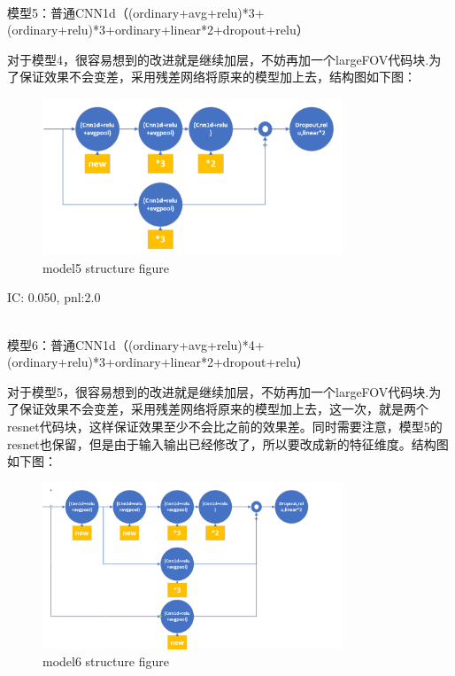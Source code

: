 \documentclass[11pt]{ctexart}
\begin{document}
~\\
模型5：普通CNN1d（(ordinary+avg+relu)*3+(ordinary+relu)*3+ordinary+linear*2+dropout+relu）

对于模型4，很容易想到的改进就是继续加层，不妨再加一个largeFOV代码块.为了保证效果不会变差，采用残差网络将原来的模型加上去，结构图如下图：
\begin{figure}[H]
\begin{center}
\includegraphics[width=0.8\textwidth]{str2.PNG}
\end{center}
\caption{model5 structure figure}
\label{FIG.2}
\end{figure}

{\kaishu \small IC: 0.050, pnl:2.0}

~\\
模型6：普通CNN1d（(ordinary+avg+relu)*4+(ordinary+relu)*3+ordinary+linear*2+dropout+relu）

对于模型5，很容易想到的改进就是继续加层，不妨再加一个largeFOV代码块.为了保证效果不会变差，采用残差网络将原来的模型加上去，这一次，就是两个resnet代码块，这样保证效果至少不会比之前的效果差。同时需要注意，模型5的resnet也保留，但是由于输入输出已经修改了，所以要改成新的特征维度。结构图如下图：
\begin{figure}[H]
\begin{center}
\includegraphics[width=0.8\textwidth]{str3.PNG}
\end{center}
\caption{model6 structure figure}
\label{FIG.3}
\end{figure}
\end{document}

